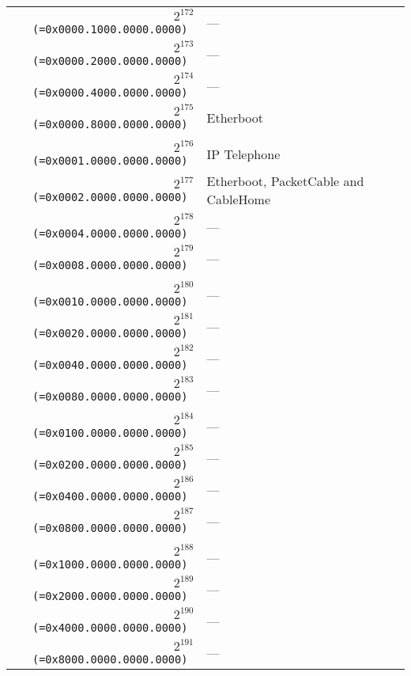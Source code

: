 \documentclass[documentation]{subfiles}
\begin{document}
\begin{small}
\begin{longtable}{>{\tt}rl}
        \\
        $2^{172}$ (=0x0000.1000.0000.0000) & --- \\
        $2^{173}$ (=0x0000.2000.0000.0000) & --- \\
        $2^{174}$ (=0x0000.4000.0000.0000) & --- \\
        $2^{175}$ (=0x0000.8000.0000.0000) & Etherboot \\
        \\
        $2^{176}$ (=0x0001.0000.0000.0000) & IP Telephone \\
        $2^{177}$ (=0x0002.0000.0000.0000) & Etherboot, PacketCable and CableHome \\
        $2^{178}$ (=0x0004.0000.0000.0000) & --- \\
        $2^{179}$ (=0x0008.0000.0000.0000) & --- \\
        \\
        $2^{180}$ (=0x0010.0000.0000.0000) & --- \\
        $2^{181}$ (=0x0020.0000.0000.0000) & --- \\
        $2^{182}$ (=0x0040.0000.0000.0000) & --- \\
        $2^{183}$ (=0x0080.0000.0000.0000) & --- \\
        \\
        $2^{184}$ (=0x0100.0000.0000.0000) & --- \\
        $2^{185}$ (=0x0200.0000.0000.0000) & --- \\
        $2^{186}$ (=0x0400.0000.0000.0000) & --- \\
        $2^{187}$ (=0x0800.0000.0000.0000) & --- \\
        \\
        $2^{188}$ (=0x1000.0000.0000.0000) & --- \\
        $2^{189}$ (=0x2000.0000.0000.0000) & --- \\
        $2^{190}$ (=0x4000.0000.0000.0000) & --- \\
        $2^{191}$ (=0x8000.0000.0000.0000) & --- \\
        \bottomrule
    \end{longtable}
\end{small}
\end{document}
